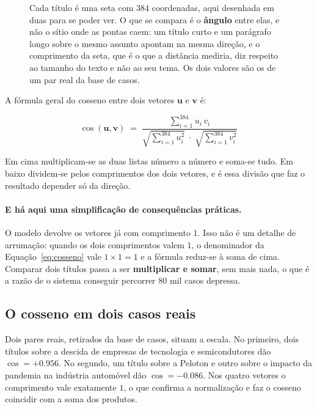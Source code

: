 \begin{figure}[ht]
\caption[O cosseno, e porque é o ângulo e não a distância]{Cada título é uma seta com $384$
coordenadas, aqui desenhada em duas para se poder ver. O que se compara é o \textbf{ângulo} entre
elas, e não o sítio onde as pontas caem: um título curto e um parágrafo longo sobre o mesmo
assunto apontam na mesma direção, e o comprimento da seta, que é o que a distância mediria, diz
respeito ao tamanho do texto e não ao seu tema. Os dois valores são os de um par real da base de casos.}
\label{fig:met_cosseno}
\end{figure}


A fórmula geral do cosseno entre dois vetores $\mathbf{u}$ e $\mathbf{v}$ é:

\begin{equation}
  \cos(\mathbf{u}, \mathbf{v}) \;=\;
  \frac{\displaystyle\sum_{i=1}^{384} u_i \, v_i}
       {\sqrt{\displaystyle\sum_{i=1}^{384} u_i^2} \; \cdot \;
        \sqrt{\displaystyle\sum_{i=1}^{384} v_i^2}}
  \label{eq:cosseno}
\end{equation}

Em cima multiplicam-se as duas listas número a número e soma-se tudo. Em baixo dividem-se pelos
comprimentos dos dois vetores, e é essa divisão que faz o resultado depender só da direção.

\paragraph{E há aqui uma simplificação de consequências práticas.}
O modelo devolve os vetores já com comprimento $1$. Isso não é um detalhe de arrumação: quando os
dois comprimentos valem $1$, o denominador da Equação~\ref{eq:cosseno} vale $1 \times 1 = 1$ e a
fórmula reduz-se à soma de cima. Comparar dois títulos passa a ser \textbf{multiplicar e somar},
sem mais nada, o que é a razão de o sistema conseguir percorrer $80$ mil casos depressa.

\subsection{O cosseno em dois casos reais}

Dois pares reais, retirados da base de casos, situam a escala. No primeiro, dois títulos sobre a
descida de empresas de tecnologia e semicondutores dão $\cos = +0.956$. No segundo, um título sobre
a Peloton e outro sobre o impacto da pandemia na indústria automóvel dão $\cos = -0.086$. Nos
quatro vetores o comprimento vale exatamente $1$, o que confirma a normalização e faz o cosseno
coincidir com a soma dos produtos.


